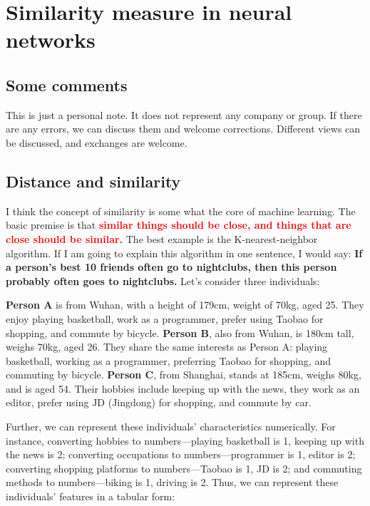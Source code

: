 \documentclass[oneside]{book}
\begin{document}
\tableofcontents
\chapter{Similarity measure in neural networks}
\section*{Some comments}
This is just a personal note. It does not represent any company or group. 
If there are any errors, we can discuss them and welcome corrections. 
Different views can be discussed, and exchanges are welcome.

\section{Distance and similarity}
I think the concept of similarity is some what the core of machine learning. 
The basic premise is that \textcolor{red}{\textbf{similar things should be close, and things that are close should be similar.}}
The best example is the K-nearest-neighbor algorithm. If I am going to explain this algorithm in one sentence, I would say: 
\textbf{If a person's best 10 friends often go to nightclubs, then this person probably often goes to nightclubs.}
Let's consider three individuals:

\textbf{Person A} is from Wuhan, with a height of 179cm, weight of 70kg, aged 25. They enjoy playing basketball, work as a programmer, prefer using Taobao for shopping, and commute by bicycle.
\textbf{Person B}, also from Wuhan, is 180cm tall, weighs 70kg, aged 26. They share the same interests as Person A: playing basketball, working as a programmer, preferring Taobao for shopping, and commuting by bicycle.
\textbf{Person C}, from Shanghai, stands at 185cm, weighs 80kg, and is aged 54. Their hobbies include keeping up with the news, they work as an editor, prefer using JD (Jingdong) for shopping, and commute by car.

Further, we can represent these individuals' characteristics numerically. For instance, converting hobbies to numbers—playing basketball is 1, keeping up with the news is 2; converting occupations to numbers—programmer is 1, editor is 2; converting shopping platforms to numbers—Taobao is 1, JD is 2; and commuting methods to numbers—biking is 1, driving is 2.
Thus, we can represent these individuals' features in a tabular form:
\end{document}
